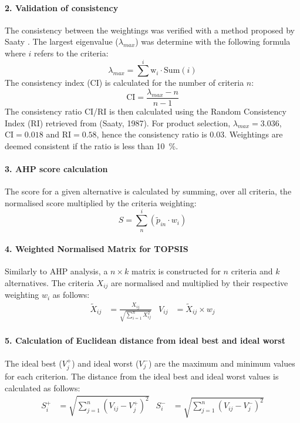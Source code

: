 \paragraph{2. Validation of consistency}
The consistency between the weightings was verified with a method proposed by Saaty \cite{saaty_analytic_1987}. The largest eigenvalue ($\lambda_{max}$) was determine with the following formula where $i$ refers to the criteria:
\begin{equation}
    \lambda_{max}=\sum^{i} \mathrm{w}_{i}\cdot \mathrm{Sum}(i)
\end{equation}
The consistency index (CI) is calculated for the number of criteria $n$:
\begin{equation}
   \mathrm{CI} = \frac{\lambda_{max}-n}{n-1}
\end{equation}
The consistency ratio CI/RI is then calculated using the Random Consistency Index (RI) retrieved from (Saaty, 1987). 
For product selection, $\lambda_{max}=3.036$, $\mathrm{CI}=0.018$ and $\mathrm{RI}=0.58$, hence the consistency ratio is 0.03. Weightings are deemed consistent if the ratio is less than \SI{10}{\percent}.

\paragraph{3. AHP score calculation}
The score for a given alternative is calculated by summing, over all criteria, the normalised score multiplied by the criteria weighting:
\begin{equation}
    S=\sum^{i}_{n}(\tilde{p}_{in} \cdot w_{i})
\end{equation}

\paragraph{4. Weighted Normalised Matrix for TOPSIS}
Similarly to AHP analysis, a $n\times k$ matrix is constructed for $n$ criteria and $k$ alternatives. The criteria $X_{ij}$ are normalised and multiplied by their respective weighting $w_i$ as follows:
\begin{align}
    \tilde{X}_{ij}&=\frac{X_{ij}}{\sqrt{\sum^{n}_{i=1}X_{ij}^{2}}} &
    V_{ij}&=\tilde{X}_{ij}\times w_j
\end{align}

\paragraph{5. Calculation of Euclidean distance from ideal best and ideal worst}
The ideal best ($V_{j}^{+}$) and ideal worst ($V_{j}^{-}$) are the maximum and minimum values for each criterion. The distance from the ideal best and ideal worst values is calculated as follows:
\begin{align}
    S_{i}^{+}&=\sqrt{\sum_{j=1}^{n}(V_{ij}-V_{j}^{+})^2} &
    S_{i}^{-}&=\sqrt{\sum_{j=1}^{n}(V_{ij}-V_{j}^{-})^2}
\end{align}

